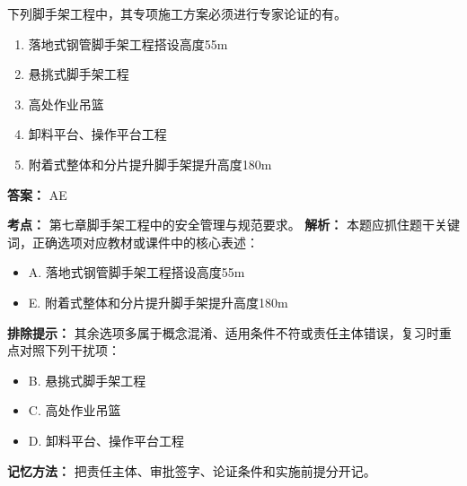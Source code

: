 \documentclass[UTF8,fontset=fandol,11pt]{ctexart}
\begin{document}
\begin{quizbox}[title={第 5 题}]
下列脚手架工程中，其专项施工方案必须进行专家论证的有。\\
\begin{enumerate}[label=\Alph*.]
\item 落地式钢管脚手架工程搭设高度55m
\item 悬挑式脚手架工程
\item 高处作业吊篮
\item 卸料平台、操作平台工程
\item 附着式整体和分片提升脚手架提升高度180m
\end{enumerate}
\textbf{答案：} AE
\vspace{0.25em}
\begin{answerbox}[title={考点解析}]
\textbf{考点：} 第七章脚手架工程中的安全管理与规范要求。
\textbf{解析：} 本题应抓住题干关键词，正确选项对应教材或课件中的核心表述：
\begin{itemize}
\item A. 落地式钢管脚手架工程搭设高度55m
\item E. 附着式整体和分片提升脚手架提升高度180m
\end{itemize}
\textbf{排除提示：} 其余选项多属于概念混淆、适用条件不符或责任主体错误，复习时重点对照下列干扰项：
\begin{itemize}
\item B. 悬挑式脚手架工程
\item C. 高处作业吊篮
\item D. 卸料平台、操作平台工程
\end{itemize}
\textbf{记忆方法：} 把责任主体、审批签字、论证条件和实施前提分开记。
\end{answerbox}
\end{quizbox}

\vspace{0.2em}
\end{document}
